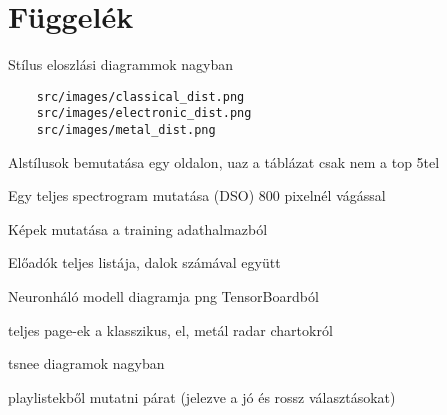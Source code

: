 \pagebreak
\pagestyle{semifancy}
\chapter{Függelék}

Stílus eloszlási diagrammok nagyban
\begin{verbatim}
    src/images/classical_dist.png
    src/images/electronic_dist.png
    src/images/metal_dist.png
\end{verbatim}

\pagebreak

Alstílusok bemutatása egy oldalon, uaz a táblázat csak nem a top 5tel

\pagebreak
Egy teljes spectrogram mutatása (DSO) 800 pixelnél vágással

\pagebreak
Képek mutatása a training adathalmazból

\pagebreak
Előadók teljes listája, dalok számával együtt

\pagebreak
Neuronháló modell diagramja png TensorBoardból

\pagebreak
teljes page-ek a klasszikus, el, metál radar chartokról

\pagebreak
tsnee diagramok nagyban

\pagebreak
playlistekből mutatni párat (jelezve a jó és rossz választásokat)
